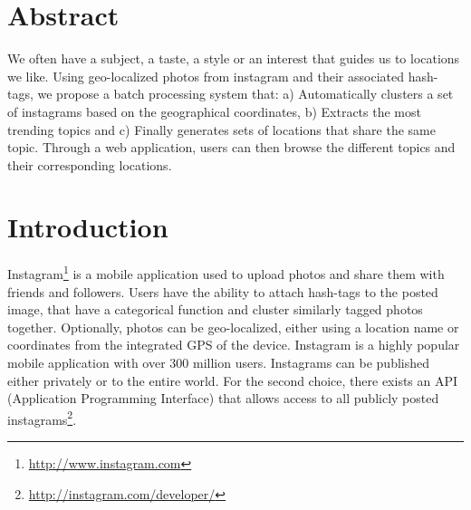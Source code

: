 %
%

% 



\newpage
\tableofcontents
\newpage
\section{Abstract}
We often have a subject, a taste, a style or an interest that guides us to locations we like.  Using geo-localized photos from instagram and their associated hash-tags, we propose a batch processing system that: a) Automatically clusters a set of instagrams based on the geographical coordinates, b) Extracts the most trending topics and c) Finally generates sets of locations that share the same topic. Through a web application, users can then browse the different topics and their corresponding locations.

\section{Introduction}
Instagram\footnote{\url{http://www.instagram.com}} is a mobile application used to upload photos and share them with friends and followers. Users have the ability to attach hash-tags to the posted image, that have a categorical function and cluster similarly tagged photos together. Optionally, photos can be geo-localized, either using a location name or coordinates from the integrated GPS of the device. Instagram is a highly popular mobile application with over $300$ million users. Instagrams can be published either privately or to the entire world. For the second choice, there exists an API (Application Programming Interface) that allows access to all publicly posted instagrams\footnote{\url{http://instagram.com/developer/}}.

